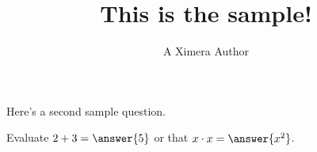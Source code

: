 \documentclass{ximera}
\title{This is the sample!}
\author{A Ximera Author}
\begin{document}
\maketitle

Here's a second sample question.

\begin{problem}
\begin{multipleChoice}
\end{multipleChoice}
\end{problem}

\begin{problem}
   Evaluate $2 + 3 = \answer{5}$ or that $x \cdot x = \answer{x^2}$.
\end{problem}
\end{document}
